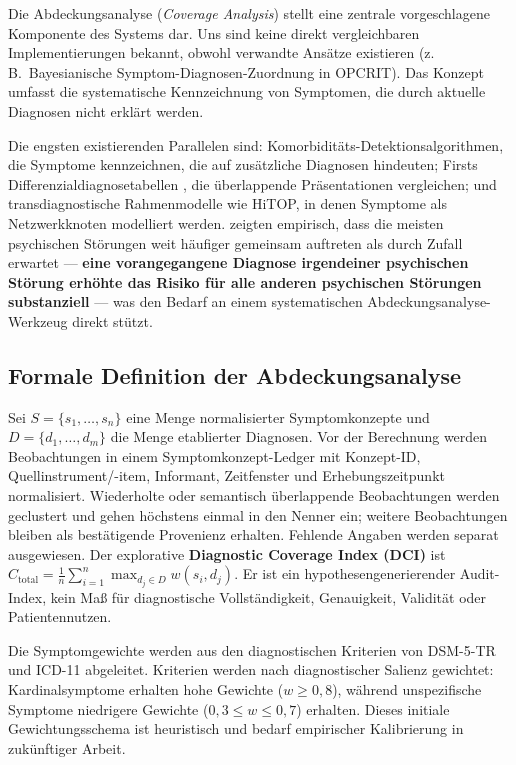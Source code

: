 \documentclass[11pt,a4paper]{article}
\begin{document}
Die Abdeckungsanalyse (\textit{Coverage Analysis}) stellt eine zentrale vorgeschlagene Komponente des Systems dar. Uns sind keine direkt vergleichbaren Implementierungen bekannt, obwohl verwandte Ans\"atze existieren (z.\,B.\ Bayesianische Symptom-Diagnosen-Zuordnung in OPCRIT). Das Konzept umfasst die systematische Kennzeichnung von Symptomen, die durch aktuelle Diagnosen nicht erkl\"art werden.

Die engsten existierenden Parallelen sind: Komorbidit\"ats-Detektionsalgorithmen, die Symptome kennzeichnen, die auf zus\"atzliche Diagnosen hindeuten; Firsts Differenzialdiagnosetabellen \citep{First2024}, die \"uberlappende Pr\"asentationen vergleichen; und transdiagnostische Rahmenmodelle wie HiTOP, in denen Symptome als Netzwerkknoten modelliert werden. \citet{PlanaRipoll2019} zeigten empirisch, dass die meisten psychischen St\"orungen weit h\"aufiger gemeinsam auftreten als durch Zufall erwartet --- \textbf{eine vorangegangene Diagnose irgendeiner psychischen St\"orung erh\"ohte das Risiko f\"ur alle anderen psychischen St\"orungen substanziell} --- was den Bedarf an einem systematischen Abdeckungsanalyse-Werkzeug direkt st\"utzt.

\subsection{Formale Definition der Abdeckungsanalyse}

Sei $S = \{s_1, \ldots, s_n\}$ eine Menge normalisierter Symptomkonzepte und $D = \{d_1, \ldots, d_m\}$ die Menge etablierter Diagnosen. Vor der Berechnung werden Beobachtungen in einem Symptomkonzept-Ledger mit Konzept-ID, Quellinstrument/-item, Informant, Zeitfenster und Erhebungszeitpunkt normalisiert. Wiederholte oder semantisch \"uberlappende Beobachtungen werden geclustert und gehen h\"ochstens einmal in den Nenner ein; weitere Beobachtungen bleiben als best\"atigende Provenienz erhalten. Fehlende Angaben werden separat ausgewiesen. Der explorative \textbf{Diagnostic Coverage Index (DCI)} ist $C_{\text{total}} = \frac{1}{n} \sum_{i=1}^{n}\max_{d_j\in D}w(s_i,d_j)$. Er ist ein hypothesengenerierender Audit-Index, kein Ma\ss{} f\"ur diagnostische Vollst\"andigkeit, Genauigkeit, Validit\"at oder Patientennutzen.

Die Symptomgewichte werden aus den diagnostischen Kriterien von DSM-5-TR und ICD-11 abgeleitet. Kriterien werden nach diagnostischer Salienz gewichtet: Kardinalsymptome erhalten hohe Gewichte ($w \geq 0{,}8$), w\"ahrend unspezifische Symptome niedrigere Gewichte ($0{,}3 \leq w \leq 0{,}7$) erhalten. Dieses initiale Gewichtungsschema ist heuristisch und bedarf empirischer Kalibrierung in zuk\"unftiger Arbeit.
\end{document}

